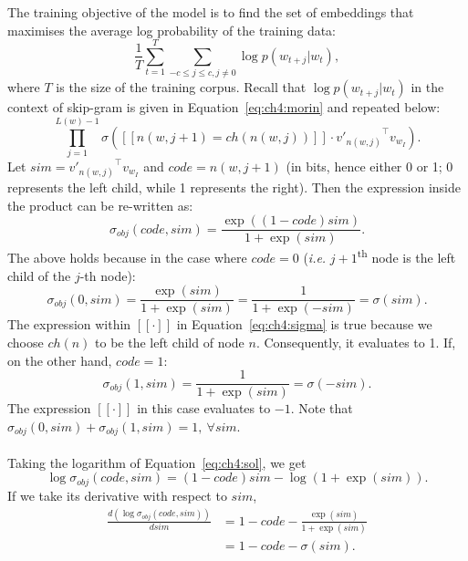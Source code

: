 \documentclass[a4paper,12pt,twoside,openright]{report}
\newcommand{\ti}{\textit}
\newcommand{\nl}{\\ \\}
\begin{document}
The training objective of the model is to find the set of embeddings that maximises the average log probability of the training data:
\begin{equation}
\frac{1}{T}\sum_{t=1}^{T}\sum_{-c \le j \le c, j \ne 0}^{}{\log p(w_{t+j}|w_t)},
\label{eq:ch4:obj}
\end{equation}
where $T$ is the size of the training corpus. Recall that $\log p(w_{t+j}|w_t)$ in the context of skip-gram is given in Equation~\ref{eq:ch4:morin} and repeated below:
\begin{equation}
\prod_{j=1}^{L(w)-1}\sigma([\![n(w,j+1)=ch(n(w,j))]\!]\cdot {v'_{n(w,j)}}^{\intercal} v_{w_I} ).
\label{eq:ch4:sigma}
\end{equation}
Let $sim={v'_{n(w,j)}}^{\intercal} v_{w_I}$ and $code=n(w,j+1)$ (in bits, hence either 0 or 1; 0 represents the left child, while 1 represents the right). Then the expression inside the product can be re-written as:
\begin{equation}
\sigma_{obj}(code,sim)=\frac{\exp((1-code)sim)}{1+\exp(sim)}.
\label{eq:ch4:sol}
\end{equation}
The above holds because in the case where $code=0$ (\ti{i.e.} $j+1$\textsuperscript{th} node is the left child of the $j$-th node):
$$\sigma_{obj}(0,sim)=\frac{\exp(sim)}{1+\exp(sim)}=\frac{1}{1+\exp(-sim)}=\sigma(sim).$$
The expression within $[\![ \cdot]\!]$ in Equation~\ref{eq:ch4:sigma} is true because we choose $ch(n)$ to be the left child of node $n$. Consequently, it evaluates to 1. If, on the other hand, $code=1$:
$$\sigma_{obj}(1,sim)=\frac{1}{1+\exp(sim)}=\sigma(-sim).$$
The expression $[\![ \cdot]\!]$ in this case evaluates to $-1$. Note that $\sigma_{obj}(0,sim)+\sigma_{obj}(1,sim)=1, \: \forall{sim}.$
\nl
Taking the logarithm of Equation~\ref{eq:ch4:sol}, we get
$$\log\sigma_{obj}(code,sim)=(1-code)sim-\log({1+\exp(sim)}).$$
If we take its derivative with respect to $sim$,
\begin{equation}
\begin{split}
\frac{d(\log\sigma_{obj}(code,sim))}{dsim}&=1-code-\frac{\exp(sim)}{1+\exp(sim)} \\ 
									&=1-code-\sigma(sim).
\end{split}
\label{eq:ch4:code}
\end{equation}
\end{document}
